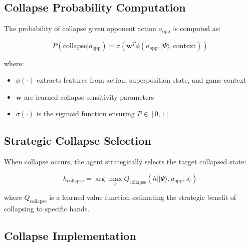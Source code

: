 \documentclass[11pt,a4paper]{article}
\begin{document}
\subsection{Collapse Probability Computation}

The probability of collapse given opponent action $a_{\text{opp}}$ is computed as:

\begin{equation}
P(\text{collapse}|a_{\text{opp}}) = \sigma\left(\mathbf{w}^T \phi(a_{\text{opp}}, |\Psi\rangle, \text{context})\right)
\end{equation}

where:
\begin{itemize}
\item $\phi(\cdot)$ extracts features from action, superposition state, and game context
\item $\mathbf{w}$ are learned collapse sensitivity parameters
\item $\sigma(\cdot)$ is the sigmoid function ensuring $P \in [0,1]$
\end{itemize}

\subsection{Strategic Collapse Selection}

When collapse occurs, the agent strategically selects the target collapsed state:

\begin{equation}
h_{\text{collapse}} = \arg\max_{h} Q_{\text{collapse}}(h | |\Psi\rangle, a_{\text{opp}}, s_t)
\end{equation}

where $Q_{\text{collapse}}$ is a learned value function estimating the strategic benefit of collapsing to specific hands.

\subsection{Collapse Implementation}
\end{document}
